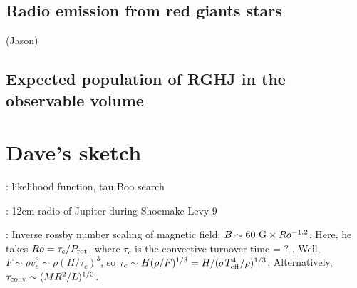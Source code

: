 \documentclass{emulateapj}
\begin{document}
\subsection{Radio emission from red giants stars}

(Jason)



\citet{gorman2013}


\subsection{Expected population of RGHJ in the observable volume}




\section{Dave's sketch}

\citep{spiegel2008}

\citep{lecavelier_et_al2013}

\citep{janhunen_et_al2003}

\citep{zarka1992, zarka1998}

\citep{farrell_et_al2004}

\citep{lazio+farrell2007}: likelihood function, tau Boo search

\citep{lecavelier_et_al2009}

\citep{spiegel2012}

\citep{nordhaus+spiegel2013}



\citep{jiang+jin1996}: 12cm radio of Jupiter during Shoemake-Levy-9

\citep{morin2012, morin_et_al2013}

\citep{christensen_et_al2009, christensen2010}

\citep{saar2001}: Inverse rossby number scaling of magnetic field: $B
\sim 60 {\rm~G} \times Ro^{-1.2}$.  Here, he takes $Ro = \tau_c/P_{\rm
  rot}$, where $\tau_c$ is the convective turnover time = ?
\citep{gilliland1986}.  Well, $F \sim \rho v_c^3 \sim \rho
(H/\tau_c)^3$, so $\tau_c \sim H (\rho / F)^{1/3} = H / (\sigma T_{\rm
  eff}^4 / \rho)^{1/3}$.  Alternatively, $\tau_{\rm conv} \sim (M R^2
/ L)^{1/3}$.
\end{document}
